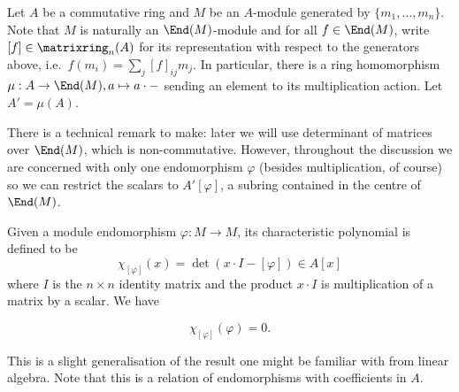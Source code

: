 \documentclass[a4paper]{article}
\begin{document}
\maketitle

Let \(A\) be a commutative ring and \(M\) be an \(A\)-module generated by \(\{m_1, \dots, m_n\}\). Note that \(M\) is naturally an \(\End(M)\)-module and for all \(f \in \End(M)\), write \([f] \in \matrixring_n(A)\) for its representation with respect to the generators above, i.e.\ \(f(m_i) = \sum_j [f]_{ij}m_j\). In particular, there is a ring homomorphism \(\mu: A \to \End(M), a \mapsto a \cdot -\) sending an element to its multiplication action. Let \(A' = \mu(A)\).

There is a technical remark to make: later we will use determinant of matrices over \(\End(M)\), which is non-commutative. However, throughout the discussion we are concerned with only one endomorphism \(\varphi\) (besides multiplication, of course) so we can restrict the scalars to \(A'[\varphi]\), a subring contained in the centre of \(\End(M)\).

Given a module endomorphism \(\varphi: M \to M\), its characteristic polynomial is defined to be
\[
  \chi_{[\varphi]}(x) = \det (x \cdot I - [\varphi]) \in A[x]
\]
where \(I\) is the \(n \times n\) identity matrix and the product \(x \cdot I\) is multiplication of a matrix by a scalar. We have

\begin{theorem}
  \[
    \chi_{[\varphi]}(\varphi) = 0.
  \]
\end{theorem}
This is a slight generalisation of the result one might be familiar with from linear algebra. Note that this is a relation of endomorphisms with coefficients in \(A\).
\end{document}
